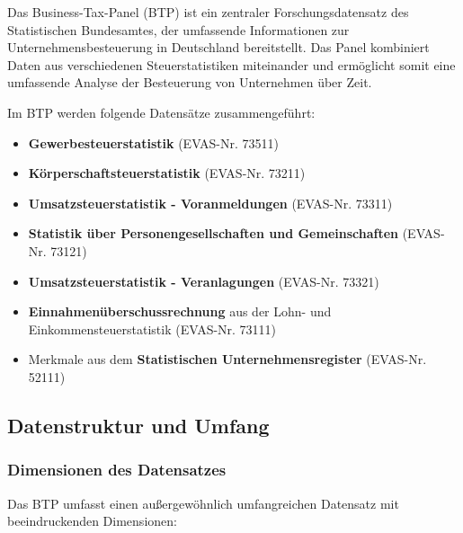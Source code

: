 \documentclass[
  ngerman,
  10pt,
  twocolumn]{article}
\providecommand{\tightlist}{%
  \setlength{\itemsep}{0pt}\setlength{\parskip}{0pt}}
\let\origtable\table
\let\endorigtable\endtable
\renewenvironment{table}[1][htbp]{%
  \origtable*[#1]%
}{%
  \endorigtable*%
}
\begin{document}
Das Business-Tax-Panel (BTP) ist ein zentraler Forschungsdatensatz des
Statistischen Bundesamtes, der umfassende Informationen zur
Unternehmensbesteuerung in Deutschland bereitstellt. Das Panel
kombiniert Daten aus verschiedenen Steuerstatistiken miteinander und
ermöglicht somit eine umfassende Analyse der Besteuerung von Unternehmen
über Zeit.

Im BTP werden folgende Datensätze zusammengeführt:

\begin{itemize}
\tightlist
\item
  \textbf{Gewerbesteuerstatistik} (EVAS-Nr. 73511)
\item
  \textbf{Körperschaftsteuerstatistik} (EVAS-Nr. 73211)
\item
  \textbf{Umsatzsteuerstatistik - Voranmeldungen} (EVAS-Nr. 73311)
\item
  \textbf{Statistik über Personengesellschaften und Gemeinschaften}
  (EVAS-Nr. 73121)
\item
  \textbf{Umsatzsteuerstatistik - Veranlagungen} (EVAS-Nr. 73321)
\item
  \textbf{Einnahmenüberschussrechnung} aus der Lohn- und
  Einkommensteuerstatistik (EVAS-Nr. 73111)
\item
  Merkmale aus dem \textbf{Statistischen Unternehmensregister} (EVAS-Nr.
  52111)
\end{itemize}

\subsection{Datenstruktur und Umfang}\label{datenstruktur-und-umfang}

\subsubsection{Dimensionen des
Datensatzes}\label{dimensionen-des-datensatzes}

Das BTP umfasst einen außergewöhnlich umfangreichen Datensatz mit
beeindruckenden Dimensionen:

\begin{table}

\caption{\label{tbl-btp-overview}Übersicht über die Dimensionen des
Business-Tax-Panel}


\end{table}%
\end{document}
